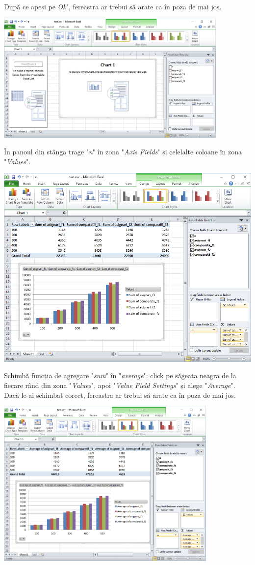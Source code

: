 \documentclass[../ro-fa-lab.tex]{subfiles}
\begin{document}
După ce apeși pe \emph{Ok}", fereastra ar trebui să arate ca în poza de
mai jos.

\includegraphics[width=4.5019in,height=2.5319in]{../Resources/lab0/image12.png}

În panoul din stânga trage "\emph{n}" în zona "\emph{Axis Fields}" și
celelalte coloane în zona "\emph{Values}".

\includegraphics[width=\textwidth]{../Resources/lab0/image13.png}

Schimbă funcția de agregare "\emph{sum}" în "\emph{average}": click pe
săgeata neagra de la fiecare rând din zona "\emph{Values}", apoi
"\emph{Value Field Settings}" și alege "\emph{Average}". Dacă le-ai
schimbat corect, fereastra ar trebui să arate ca în poza de mai jos.

\includegraphics[width=4.29645in,height=3.26824in]{../Resources/lab0/image14.png}
\end{document}
